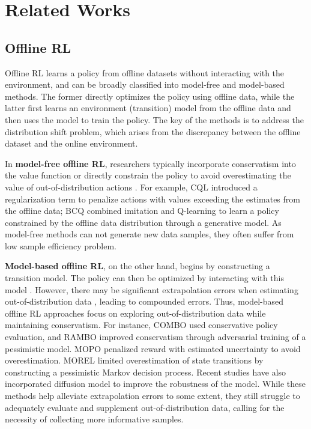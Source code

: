 \documentclass[conference]{IEEEtran}
\begin{document}
\section{Related Works}

\subsection{Offline RL}
Offline RL learns a policy from offline datasets without interacting with the environment, and can be broadly classified into model-free and model-based methods. The former directly optimizes the policy using offline data, while the latter first learns an environment (transition) model from the offline data and then uses the model to train the policy. The key of the methods is to address the distribution shift problem, which arises from the discrepancy between the offline dataset and the online environment.

In \textbf{model-free offline RL}, researchers typically incorporate conservatism into the value function or directly constrain the policy to avoid overestimating the value of out-of-distribution actions \cite{wu2019behavior,xu2022policy,kumar2019stabilizing,mcq,iql}. For example, CQL \cite{cql} introduced a regularization term to penalize actions with values exceeding the estimates from the offline data; BCQ \cite{wu2019behavior} combined imitation and Q-learning to learn a policy constrained by the offline data distribution through a generative model. As model-free methods can not generate new data samples, they often suffer from low sample efficiency problem.

\textbf{Model-based offline RL}, on the other hand, begins by constructing a transition model. The policy can then be optimized by interacting with this model \cite{mbpo,mopo,wang2021offline,lu2024synthetic}. However, there may be significant extrapolation errors when estimating out-of-distribution data \cite{extraerror}, leading to compounded errors. Thus, model-based offline RL approaches focus on exploring out-of-distribution data while maintaining conservatism. For instance, COMBO \cite{combo} used conservative policy evaluation, and RAMBO \cite{rambo} improved conservatism through adversarial training of a pessimistic model. MOPO \cite{mopo} penalized reward with estimated uncertainty to avoid overestimation. MOREL \cite{morel} limited overestimation of state transitions by constructing a pessimistic Markov decision process. Recent studies \cite{sun2024conformal,zhou2024diffusion} have also incorporated diffusion model to improve the robustness of the model. While these methods help alleviate extrapolation errors to some extent, they still struggle to adequately evaluate and supplement out-of-distribution data, calling for the necessity of collecting more informative samples.
\end{document}
